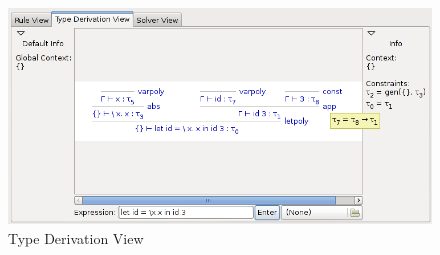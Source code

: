 \begin{figure}[t]
\begin{center}
\leavevmode
\includegraphics[width=\textwidth]{Figures/typeview.png}
\end{center}
\caption{Type Derivation View}
\label{fig:typeview}
\end{figure}